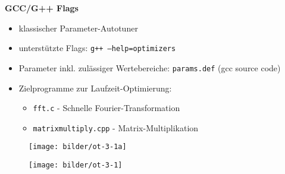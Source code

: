     \begingroup
    \begin{frame}
      
    \textbf{GCC/G++ Flags}
      \begin{itemize}
        \item klassischer Parameter-Autotuner
        \item unterstützte Flags: \texttt{g++ --help=optimizers}
        \item Parameter inkl. zulässiger Wertebereiche: \texttt{params.def} (gcc source code)
        
        
        \item Zielprogramme zur Laufzeit-Optimierung:
        \begin{itemize}
          \item \texttt{fft.c} - Schnelle Fourier-Transformation
          \item \texttt{matrixmultiply.cpp} - Matrix-Multiplikation
        \end{itemize}        
      \end{itemize}
    \end{frame}
    \endgroup
        
    \begingroup
  \begin{frame}
    \begin{figure}[ht]
      \centering	      
      \texttt{[image: bilder/ot-3-1a]}
      \label{gccpy1a}
    \end{figure}
  \end{frame}
  \endgroup
  
  \begingroup
  \begin{frame}
    \begin{figure}[ht]
      \centering	      
      \texttt{[image: bilder/ot-3-1]}
      \label{gccpy1}
    \end{figure}
  \end{frame}
\endgroup
  
